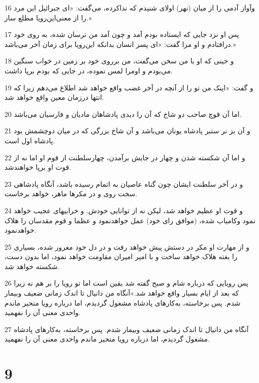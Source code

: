 \par 16 وآواز آدمی را از میان (نهر) اولای شنیدم که نداکرده، می‌گفت: «ای جبرائیل این مرد را از معنی‌این‌رویا مطلع ساز.»
\par 17 پس او نزد جایی که ایستاده بودم آمد و چون آمد من ترسان شده، به روی خود درافتادم و او مرا گفت: «ای پسر انسان بدانکه این‌رویا برای زمان آخر می‌باشد.»
\par 18 و حینی که او با من سخن می‌گفت، من برروی خود بر زمین در خواب سنگین می‌بودم و اومرا لمس نموده، در جایی که بودم برپا داشت.
\par 19 و گفت: «اینک من تو را از آنچه در آخر غضب واقع خواهد شد اطلاع می‌دهم زیرا که انتها درزمان معین واقع خواهد شد.
\par 20 اما آن قوچ صاحب دو شاخ که آن را دیدی پادشاهان مادیان و فارسیان می‌باشد.
\par 21 و آن بز نر ستبر پادشاه یونان می‌باشد و آن شاخ بزرگی که در میان دوچشمش بود پادشاه اول است.
\par 22 و اما آن شکسته شدن و چهار در جایش برآمدن، چهارسلطنت از قوم او اما نه از قوت او برپا خواهندشد.
\par 23 و در آخر سلطنت ایشان چون گناه عاصیان به اتمام رسیده باشد، آنگاه پادشاهی سخت روی و در مکرها ماهر، خواهد برخاست.
\par 24 و قوت او عظیم خواهد شد، لیکن نه از توانایی خودش. و خرابیهای عجیب خواهد نمود وکامیاب شده، (موافق رای خود) عمل خواهدنمود و عظما و قوم مقدسان را هلاک خواهدنمود.
\par 25 و از مهارت او مکر در دستش پیش خواهد رفت و در دل خود مغرور شده، بسیاری را بغته هلاک خواهد ساخت و با امیر امیران مقاومت خواهد نمود، اما بدون دست، شکسته خواهد شد.
\par 26 پس رویایی که درباره شام و صبح گفته شد یقین است اما تو رویا را بر هم نه زیرا که بعد از ایام بسیار واقع خواهد شد.»آنگاه من دانیال تا اندک زمانی ضعیف وبیمار شدم. پس برخاسته، به‌کارهای پادشاه مشغول گردیدم، اما درباره رویا متحیر ماندم واحدی معنی آن را نفهمید.
\par 27 آنگاه من دانیال تا اندک زمانی ضعیف وبیمار شدم. پس برخاسته، به‌کارهای پادشاه مشغول گردیدم، اما درباره رویا متحیر ماندم واحدی معنی آن را نفهمید.

\chapter{9}

